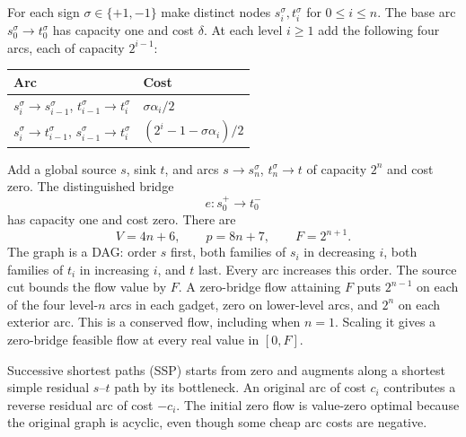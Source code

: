 \documentclass[11pt]{article}
\theoremstyle{remark}\newtheorem{remark}[theorem]{Remark}
\begin{document}
For each sign $\sigma\in\{+1,-1\}$ make distinct nodes $s_i^\sigma,t_i^\sigma$ for $0\le i\le n$. The base arc $s_0^\sigma\to t_0^\sigma$ has capacity one and cost $\delta$. At each level $i\ge1$ add the following four arcs, each of capacity $2^{i-1}$:
\begin{center}
\begin{tabular}{ll}
\toprule
Arc & Cost\\\midrule
$s_i^\sigma\to s_{i-1}^\sigma$, $t_{i-1}^\sigma\to t_i^\sigma$ & $\sigma\alpha_i/2$\\
$s_i^\sigma\to t_{i-1}^\sigma$, $s_{i-1}^\sigma\to t_i^\sigma$ & $(2^i-1-\sigma\alpha_i)/2$\\\bottomrule
\end{tabular}
\end{center}
Add a global source $s$, sink $t$, and arcs $s\to s_n^\sigma$, $t_n^\sigma\to t$ of capacity $2^n$ and cost zero. The distinguished bridge
\[
 e:s_0^+\longrightarrow t_0^-
\]
has capacity one and cost zero. There are
\[
 V=4n+6,\qquad p=8n+7,\qquad F=2^{n+1}.
\]
The graph is a DAG: order $s$ first, both families of $s_i$ in decreasing $i$, both families of $t_i$ in increasing $i$, and $t$ last. Every arc increases this order. The source cut bounds the flow value by $F$. A zero-bridge flow attaining $F$ puts $2^{n-1}$ on each of the four level-$n$ arcs in each gadget, zero on lower-level arcs, and $2^n$ on each exterior arc. This is a conserved flow, including when $n=1$. Scaling it gives a zero-bridge feasible flow at every real value in $[0,F]$.

Successive shortest paths (SSP) starts from zero and augments along a shortest simple residual $s$--$t$ path by its bottleneck. An original arc of cost $c_i$ contributes a reverse residual arc of cost $-c_i$. The initial zero flow is value-zero optimal because the original graph is acyclic, even though some cheap arc costs are negative.
\end{document}
